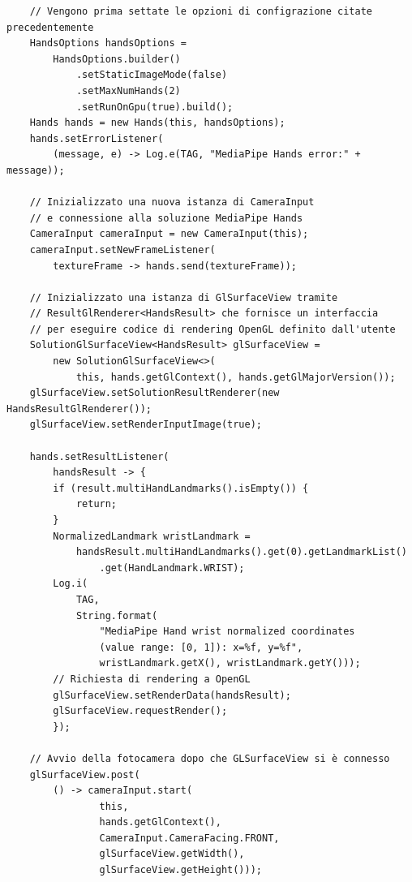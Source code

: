 \begin{verbatim}
    // Vengono prima settate le opzioni di configrazione citate precedentemente
    HandsOptions handsOptions =
        HandsOptions.builder()
            .setStaticImageMode(false)
            .setMaxNumHands(2)
            .setRunOnGpu(true).build();
    Hands hands = new Hands(this, handsOptions);
    hands.setErrorListener(
        (message, e) -> Log.e(TAG, "MediaPipe Hands error:" + message));

    // Inizializzato una nuova istanza di CameraInput
    // e connessione alla soluzione MediaPipe Hands
    CameraInput cameraInput = new CameraInput(this);
    cameraInput.setNewFrameListener(
        textureFrame -> hands.send(textureFrame));

    // Inizializzato una istanza di GlSurfaceView tramite 
    // ResultGlRenderer<HandsResult> che fornisce un interfaccia 
    // per eseguire codice di rendering OpenGL definito dall'utente
    SolutionGlSurfaceView<HandsResult> glSurfaceView =
        new SolutionGlSurfaceView<>(
            this, hands.getGlContext(), hands.getGlMajorVersion());
    glSurfaceView.setSolutionResultRenderer(new HandsResultGlRenderer());
    glSurfaceView.setRenderInputImage(true);

    hands.setResultListener(
        handsResult -> {
        if (result.multiHandLandmarks().isEmpty()) {
            return;
        }
        NormalizedLandmark wristLandmark =
            handsResult.multiHandLandmarks().get(0).getLandmarkList()
                .get(HandLandmark.WRIST);
        Log.i(
            TAG,
            String.format(
                "MediaPipe Hand wrist normalized coordinates 
                (value range: [0, 1]): x=%f, y=%f",
                wristLandmark.getX(), wristLandmark.getY()));
        // Richiesta di rendering a OpenGL
        glSurfaceView.setRenderData(handsResult);
        glSurfaceView.requestRender();
        });

    // Avvio della fotocamera dopo che GLSurfaceView si è connesso
    glSurfaceView.post(
        () -> cameraInput.start(
                this,
                hands.getGlContext(),
                CameraInput.CameraFacing.FRONT,
                glSurfaceView.getWidth(),
                glSurfaceView.getHeight()));
\end{verbatim}
